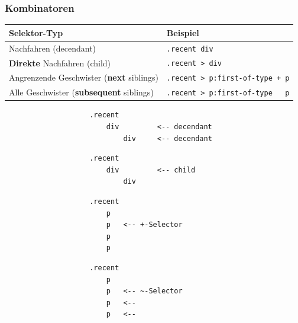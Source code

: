\documentclass[a4paper, landscape, 8pt]{scrartcl}
\begin{document}
\begin{multicols*}{4}
        \subsubsection{Kombinatoren}
        \begin{tabularx}{\columnwidth}{X X}
            \textbf{Selektor-Typ} & \textbf{Beispiel} \\
            \hline
            Nachfahren (decendant) & \texttt{.recent div} \\
            \hline
            \textbf{Direkte} Nachfahren (child) & \texttt{.recent > div} \\
            \hline
            Angrenzende Geschwister (\textbf{next} siblings) & \texttt{.recent > p:first-of-type + p} \\
            \hline
            Alle Geschwister (\textbf{subsequent} siblings) & \texttt{.recent > p:first-of-type ~ p} \\
        \end{tabularx}

        \begin{multicols*}{2}
            \begin{lstlisting}
                    .recent
                        div         <-- decendant
                            div     <-- decendant
            \end{lstlisting}

            \begin{lstlisting}
                    .recent
                        div         <-- child
                            div
            \end{lstlisting}

            \columnbreak

            \begin{lstlisting}
                    .recent
                        p
                        p   <-- +-Selector
                        p
                        p
            \end{lstlisting}

            \begin{lstlisting}
                    .recent
                        p
                        p   <-- ~-Selector
                        p   <--
                        p   <--
            \end{lstlisting}
        \end{multicols*}
        

\end{multicols*}
\end{document}
